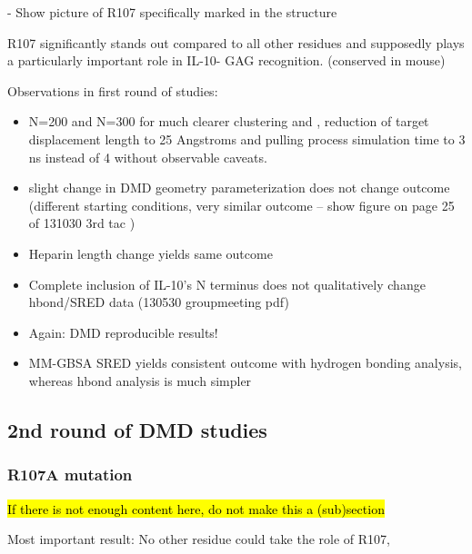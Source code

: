 - Show picture of R107 specifically marked in the structure


R107 significantly stands out compared to all other residues
and supposedly plays a particularly important role in IL-10-
GAG recognition.
(conserved in mouse)

Observations in first round of studies:

\begin{itemize}

\item N=200 and N=300 for much clearer clustering and , reduction of target displacement length
to 25  Angstroms and pulling process simulation time to 3 ns instead of 4 without
observable caveats.

\item slight change in DMD geometry parameterization does not change outcome (different starting conditions, very similar outcome -- show figure on page 25 of 131030 3rd tac )

\item Heparin length change yields same outcome

\item Complete inclusion of IL-10's N terminus does not qualitatively change hbond/SRED data (130530 groupmeeting pdf)

\item Again: DMD reproducible results!

\item MM-GBSA SRED yields consistent outcome with hydrogen bonding analysis,
whereas hbond analysis is much simpler


\end{itemize}

\subsection{2nd round of DMD studies}

\subsubsection{R107A mutation}

\hl{If there is not enough content here, do not make this a (sub)section}

Most important result: No other residue could take the role of R107,

